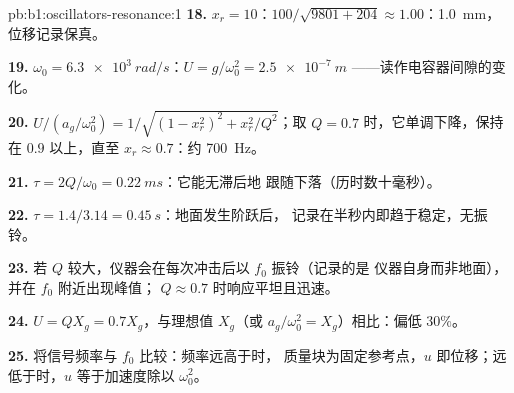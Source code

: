 \begin{solution}{pb:b1:oscillators-resonance:1}
\textbf{18.} $x_r = 10$：$100/\sqrt{9801 + 204} \approx 1.00$：\qty{1.0}{mm}，
位移记录保真。

\textbf{19.} $\omega_0 = \qty{6.3e3}{rad/s}$：$U = g/\omega_0^2 = \qty{2.5e-7}{m}$
——读作电容器间隙的变化。

\textbf{20.} $U/(a_g/\omega_0^2) = 1/\sqrt{(1 - x_r^2)^2 + x_r^2/Q^2}$；取
$Q = 0.7$ 时，它单调下降，保持在 $0.9$ 以上，直至
$x_r \approx 0.7$：约 \qty{700}{Hz}。

\textbf{21.} $\tau = 2Q/\omega_0 = \qty{0.22}{ms}$：它能无滞后地
跟随下落（历时数十毫秒）。

\textbf{22.} $\tau = 1.4/3.14 = \qty{0.45}{s}$：地面发生阶跃后，
记录在半秒内即趋于稳定，无振铃。

\textbf{23.} 若 $Q$ 较大，仪器会在每次冲击后以 $f_0$ 振铃（记录的是
仪器自身而非地面），并在 $f_0$ 附近出现峰值；
$Q \approx 0.7$ 时响应平坦且迅速。

\textbf{24.} $U = QX_g = 0.7X_g$，与理想值 $X_g$（或 $a_g/\omega_0^2
= X_g$）相比：偏低 $30\%$。

\textbf{25.} 将信号频率与 $f_0$ 比较：频率远高于时，
质量块为固定参考点，$u$ 即位移；远低于时，$u$
等于加速度除以 $\omega_0^2$。
\end{solution}
